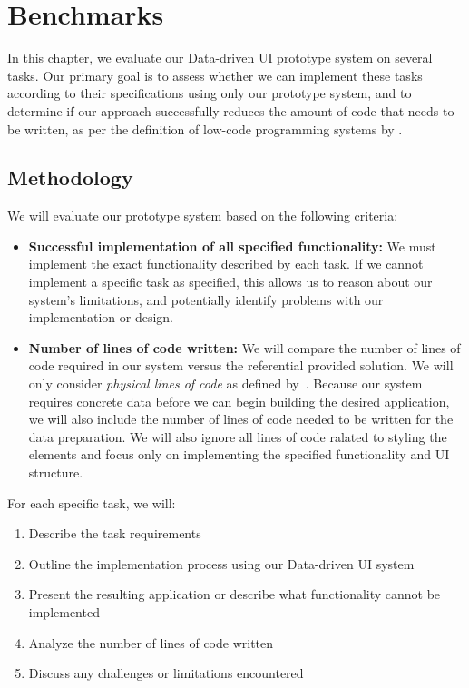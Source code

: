 \chapter{Benchmarks}
\label{chap:walktrough}

In this chapter, we evaluate our Data-driven UI prototype system on several tasks. Our primary goal is to assess whether we can implement these tasks according to their specifications using only our prototype system, and to determine if our approach successfully reduces the amount of code that needs to be written, as per the definition of low-code programming systems by \citet{Pinho_Aguiar_Amaral_2023}.

\section{Methodology}
We will evaluate our prototype system based on the following criteria:
\begin{itemize}
	\item \textbf{Successful implementation of all specified functionality:}
	      We must implement the exact functionality described by each task.
	      If we cannot implement a specific task as specified, this allows us to reason about our system's limitations, and potentially
	      identify problems with our implementation or design.

	\item \textbf{Number of lines of code written:}
	      We will compare the number of lines of code required in our system versus the referential provided solution.
	      We will only consider \emph{physical lines of code} as defined by~\citet{Park_1992}.
	      Because our system requires concrete data before we can begin building the desired application, we will also include the
	      number of lines of code needed to be written for the data preparation.
	      We will also ignore all lines of code ralated to styling the elements and focus only on implementing the specified functionality and UI structure.

\end{itemize}

For each specific task, we will:
\begin{enumerate}
	\item Describe the task requirements
	\item Outline the implementation process using our Data-driven UI system
	\item Present the resulting application or describe what functionality cannot be implemented
	\item Analyze the number of lines of code written
	\item Discuss any challenges or limitations encountered
\end{enumerate}

